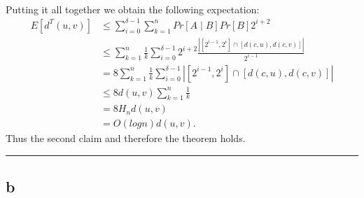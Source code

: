 \documentclass[letterpaper,12pt,oneside,onecolumn]{article}
\newenvironment{proof}{{\bf Proof:  }}{\hfill\rule{2mm}{2mm}}
\begin{document}
\begin{proof}
\paragraph{}
Putting it all together we obtain the following expectation:
\begin{align*}
E[d^T(u,v)] &\leq \sum_{i=0}^{\delta -1} \sum_{k=1}^n Pr [A \mid B]Pr[B] 2^{i+2} \\
&\leq \sum_{k=1}^n \frac{1}{k} \sum_{i=0}^{\delta -1 }  2^{i+2}\frac{| [2^{i-1},2^i] \cap [d(c,u),d(c,v)]|}{2^{i-1}} \\
&= 8 \sum_{k=1}^n \frac{1}{k} \sum_{i=0}^{\delta -1 }  | [2^{i-1},2^i] \cap [d(c,u),d(c,v)]| \\
&\leq 8 d(u,v) \sum_{k=1}^n \frac{1}{k} \\
&= 8 H_n d(u,v) \\
&= O(log n) d(u,v).
\end{align*}
Thus the second claim and therefore the theorem holds.
\end{proof}

\subsection{b}
\end{document}

